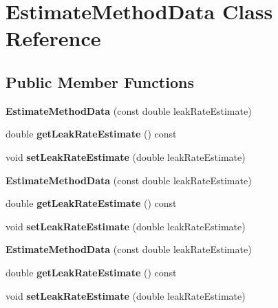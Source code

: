 \hypertarget{class_estimate_method_data}{}\section{Estimate\+Method\+Data Class Reference}
\label{class_estimate_method_data}
\subsection*{Public Member Functions}
\begin{DoxyCompactItemize}
\item 
\mbox{\label{class_estimate_method_data_adc4a6c2c2261e53b0a86c79e553dd1b2}} 
{\bfseries Estimate\+Method\+Data} (const double leak\+Rate\+Estimate)
\item 
\mbox{\label{class_estimate_method_data_a54dd94ce55b1e9d17a8e9855a7308e1d}} 
double {\bfseries get\+Leak\+Rate\+Estimate} () const
\item 
\mbox{\label{class_estimate_method_data_a8ea1c21a74831c829949167962970642}} 
void {\bfseries set\+Leak\+Rate\+Estimate} (double leak\+Rate\+Estimate)
\item 
\mbox{\label{class_estimate_method_data_adc4a6c2c2261e53b0a86c79e553dd1b2}} 
{\bfseries Estimate\+Method\+Data} (const double leak\+Rate\+Estimate)
\item 
\mbox{\label{class_estimate_method_data_a54dd94ce55b1e9d17a8e9855a7308e1d}} 
double {\bfseries get\+Leak\+Rate\+Estimate} () const
\item 
\mbox{\label{class_estimate_method_data_a8ea1c21a74831c829949167962970642}} 
void {\bfseries set\+Leak\+Rate\+Estimate} (double leak\+Rate\+Estimate)
\item 
\mbox{\label{class_estimate_method_data_adc4a6c2c2261e53b0a86c79e553dd1b2}} 
{\bfseries Estimate\+Method\+Data} (const double leak\+Rate\+Estimate)
\item 
\mbox{\label{class_estimate_method_data_a54dd94ce55b1e9d17a8e9855a7308e1d}} 
double {\bfseries get\+Leak\+Rate\+Estimate} () const
\item 
\mbox{\label{class_estimate_method_data_a8ea1c21a74831c829949167962970642}} 
void {\bfseries set\+Leak\+Rate\+Estimate} (double leak\+Rate\+Estimate)
\end{DoxyCompactItemize}


